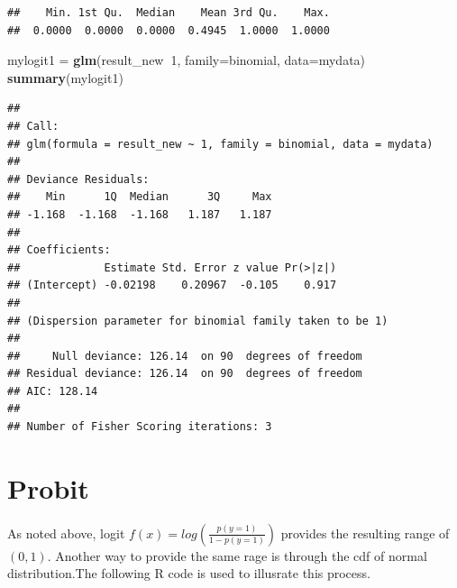 \documentclass[]{book}
\newenvironment{Shaded}{\begin{snugshade}}{\end{snugshade}}
\newcommand{\DataTypeTok}[1]{\textcolor[rgb]{0.13,0.29,0.53}{#1}}
\newcommand{\DecValTok}[1]{\textcolor[rgb]{0.00,0.00,0.81}{#1}}
\newcommand{\KeywordTok}[1]{\textcolor[rgb]{0.13,0.29,0.53}{\textbf{#1}}}
\newcommand{\NormalTok}[1]{#1}
\newcommand{\OperatorTok}[1]{\textcolor[rgb]{0.81,0.36,0.00}{\textbf{#1}}}
\newcommand{\StringTok}[1]{\textcolor[rgb]{0.31,0.60,0.02}{#1}}
\begin{document}
\begin{Shaded}
\end{Shaded}

\begin{verbatim}
##    Min. 1st Qu.  Median    Mean 3rd Qu.    Max. 
##  0.0000  0.0000  0.0000  0.4945  1.0000  1.0000
\end{verbatim}

\begin{Shaded}
\begin{Highlighting}[]
\NormalTok{mylogit1 =}\StringTok{ }\KeywordTok{glm}\NormalTok{(result_new}\OperatorTok{~}\DecValTok{1}\NormalTok{, }\DataTypeTok{family=}\NormalTok{binomial, }\DataTypeTok{data=}\NormalTok{mydata)}
\KeywordTok{summary}\NormalTok{(mylogit1)}
\end{Highlighting}
\end{Shaded}

\begin{verbatim}
## 
## Call:
## glm(formula = result_new ~ 1, family = binomial, data = mydata)
## 
## Deviance Residuals: 
##    Min      1Q  Median      3Q     Max  
## -1.168  -1.168  -1.168   1.187   1.187  
## 
## Coefficients:
##             Estimate Std. Error z value Pr(>|z|)
## (Intercept) -0.02198    0.20967  -0.105    0.917
## 
## (Dispersion parameter for binomial family taken to be 1)
## 
##     Null deviance: 126.14  on 90  degrees of freedom
## Residual deviance: 126.14  on 90  degrees of freedom
## AIC: 128.14
## 
## Number of Fisher Scoring iterations: 3
\end{verbatim}

\hypertarget{probit}{%
\section{Probit}\label{probit}}

As noted above, logit \(f(x)=log(\frac{p(y=1)}{1-p(y=1)})\) provides the resulting range of \((0,1)\). Another way to provide the same rage is through the cdf of normal distribution.The following R code is used to illusrate this process.
\end{document}
